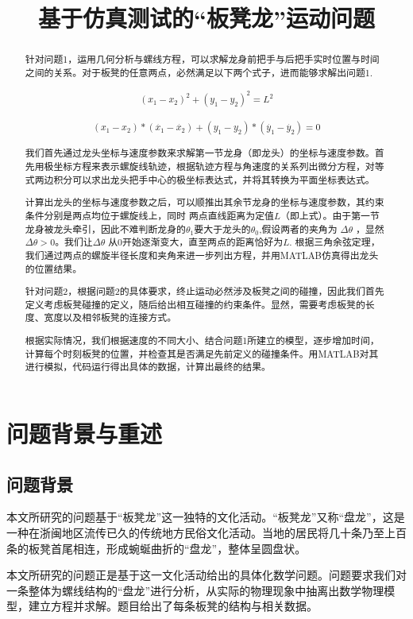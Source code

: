 \documentclass[withoutpreface,bwprint]{cumcmthesis1} %
\title{基于仿真测试的“板凳龙”运动问题}
\begin{document}
\maketitle
\begin{abstract}
针对问题1，运用几何分析与螺线方程，可以求解龙身前把手与后把手实时位置与时间之间的关系。对于板凳的任意两点，必然满足以下两个式子，进而能够求解出问题1.\par
\[
\begin{array}{l}
\left(x_{1}-x_{2}\right)^{2} 
+\left(y_{1}-y_{2}\right)^{2} 
=L^{2}
\end{array} 
\]
\par
\[
\begin{array}{l}
(x_{1}-x_{2})* (\dot{x_{1}}-\dot{x_{2}})
+(y_{1}-y_{2})* (\dot{y_{1}}-\dot{y_{2}})
=0
\end{array}
\]
\par
我们首先通过龙头坐标与速度参数来求解第一节龙身（即龙头）的坐标与速度参数。首先用极坐标方程来表示螺旋线轨迹，根据轨迹方程与角速度的关系列出微分方程，对等式两边积分可以求出龙头把手中心的极坐标表达式，并将其转换为平面坐标表达式。\par
计算出龙头的坐标与速度参数之后，可以顺推出其余节龙身的坐标与速度参数，其约束条件分别是两点均位于螺旋线上，同时
两点直线距离为定值$L$（即上式）。由于第一节龙身被龙头牵引，因此不难判断龙身的$\theta_1$要大于龙头的$\theta_0$,假设两者的夹角为
$\Delta  \theta$ ，显然$\Delta  \theta >0$。我们让$\Delta  \theta$ 从0开始逐渐变大，直至两点的距离恰好为$L$.
根据三角余弦定理，我们通过两点的螺旋半径长度和夹角来进一步列出方程，并用MATLAB仿真得出龙头的位置结果。\par
针对问题2，根据问题2的具体要求，终止运动必然涉及板凳之间的碰撞，因此我们首先定义考虑板凳碰撞的定义，随后给出相互碰撞的约束条件。显然，需要考虑板凳的长度、宽度以及相邻板凳的连接方式。\par
根据实际情况，我们根据速度的不同大小、结合问题1所建立的模型，逐步增加时间，计算每个时刻板凳的位置，并检查其是否满足先前定义的碰撞条件。用MATLAB对其进行模拟，代码运行得出具体的数据，计算出最终的结果。
\end{abstract}

\section{问题背景与重述}
\subsection{问题背景}
本文所研究的问题基于“板凳龙”这一独特的文化活动。“板凳龙”又称“盘龙”，这是一种在浙闽地区流传已久的传统地方民俗文化活动。当地的居民将几十条乃至上百条的板凳首尾相连，形成蜿蜒曲折的“盘龙”，整体呈圆盘状。\par
本文所研究的问题正是基于这一文化活动给出的具体化数学问题。问题要求我们对一条整体为螺线结构的“盘龙”进行分析，从实际的物理现象中抽离出数学物理模型，建立方程并求解。题目给出了每条板凳的结构与相关数据。\par
\end{document}
